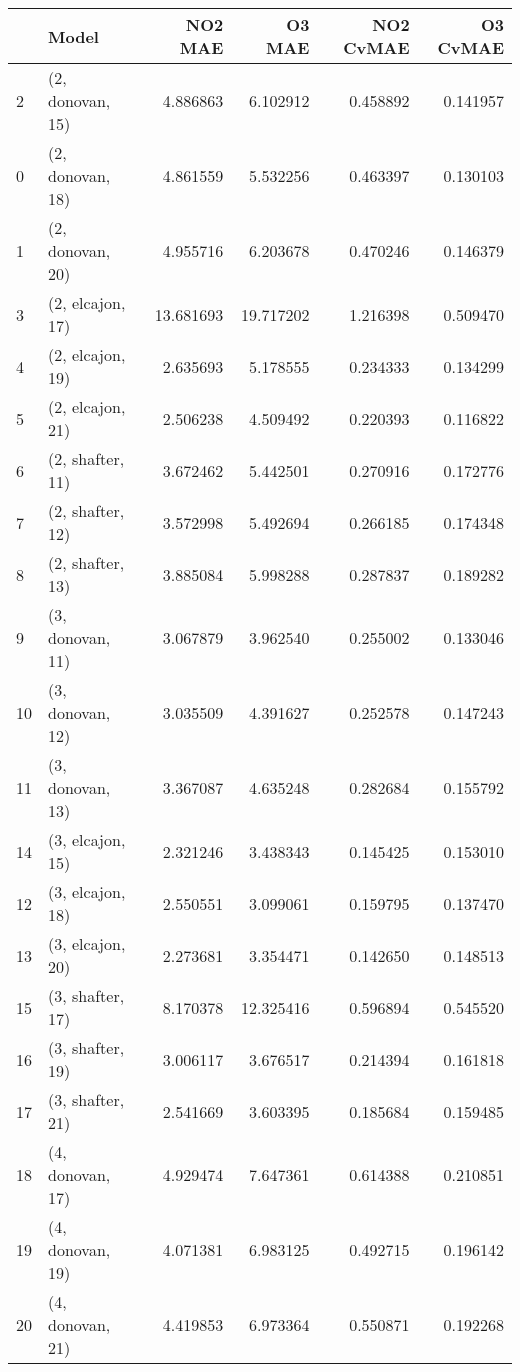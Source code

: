 \begin{tabular}{llrrrr}
\toprule
{} &             Model &    NO2 MAE &     O3 MAE &  NO2 CvMAE &  O3 CvMAE \\
\midrule
2  &  (2, donovan, 15) &   4.886863 &   6.102912 &   0.458892 &  0.141957 \\
0  &  (2, donovan, 18) &   4.861559 &   5.532256 &   0.463397 &  0.130103 \\
1  &  (2, donovan, 20) &   4.955716 &   6.203678 &   0.470246 &  0.146379 \\
3  &  (2, elcajon, 17) &  13.681693 &  19.717202 &   1.216398 &  0.509470 \\
4  &  (2, elcajon, 19) &   2.635693 &   5.178555 &   0.234333 &  0.134299 \\
5  &  (2, elcajon, 21) &   2.506238 &   4.509492 &   0.220393 &  0.116822 \\
6  &  (2, shafter, 11) &   3.672462 &   5.442501 &   0.270916 &  0.172776 \\
7  &  (2, shafter, 12) &   3.572998 &   5.492694 &   0.266185 &  0.174348 \\
8  &  (2, shafter, 13) &   3.885084 &   5.998288 &   0.287837 &  0.189282 \\
9  &  (3, donovan, 11) &   3.067879 &   3.962540 &   0.255002 &  0.133046 \\
10 &  (3, donovan, 12) &   3.035509 &   4.391627 &   0.252578 &  0.147243 \\
11 &  (3, donovan, 13) &   3.367087 &   4.635248 &   0.282684 &  0.155792 \\
14 &  (3, elcajon, 15) &   2.321246 &   3.438343 &   0.145425 &  0.153010 \\
12 &  (3, elcajon, 18) &   2.550551 &   3.099061 &   0.159795 &  0.137470 \\
13 &  (3, elcajon, 20) &   2.273681 &   3.354471 &   0.142650 &  0.148513 \\
15 &  (3, shafter, 17) &   8.170378 &  12.325416 &   0.596894 &  0.545520 \\
16 &  (3, shafter, 19) &   3.006117 &   3.676517 &   0.214394 &  0.161818 \\
17 &  (3, shafter, 21) &   2.541669 &   3.603395 &   0.185684 &  0.159485 \\
18 &  (4, donovan, 17) &   4.929474 &   7.647361 &   0.614388 &  0.210851 \\
19 &  (4, donovan, 19) &   4.071381 &   6.983125 &   0.492715 &  0.196142 \\
20 &  (4, donovan, 21) &   4.419853 &   6.973364 &   0.550871 &  0.192268 \\

\end{tabular}
